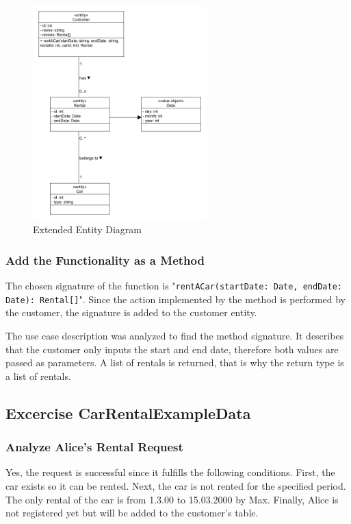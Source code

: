 \begin{figure}[H]
    \centering
    \includegraphics[width=0.6\textwidth]{figures/goLang/carRental/carRental_extendedEntity.png}
    \caption{Extended Entity Diagram}
    \label{fig:extendedEntityDiagram}
\end{figure}

\subsubsection*{Add the Functionality as a Method}
The chosen signature of the function is "\texttt{rentACar(startDate: Date, endDate: Date): Rental[]}".
Since the action implemented by the method is performed by the customer, the signature is added to the customer entity.

The use case description was analyzed to find the method signature.
It describes that the customer only inputs the start and end date, therefore both values are passed as parameters.
A list of rentals is returned, that is why the return type is a list of rentals.

\subsection{Excercise CarRentalExampleData}
\label{sec:exercise_car_rental_example_data}
\subsubsection*{Analyze Alice's Rental Request}
Yes, the request is successful since it fulfills the following conditions.
First, the car exists so it can be rented.
Next, the car is not rented for the specified period.
The only rental of the car is from 1.3.00 to 15.03.2000 by Max.
Finally, Alice is not registered yet but will be added to the customer's table.

